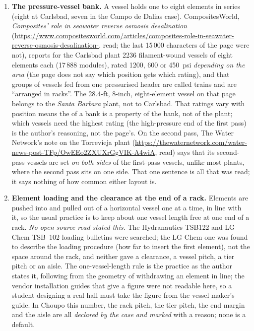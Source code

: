 \documentclass[11pt,a4paper]{article}
\begin{document}
\begin{enumerate}
\item \textbf{The pressure-vessel bank.}  A vessel holds one to eight
elements in series (eight at Carlsbad, seven in the Campo de Dalias case).
CompositesWorld, \emph{Composites' role in seawater reverse osmosis
desalination}
(\url{https://www.compositesworld.com/articles/composites-role-in-seawater-reverse-osmosis-desalination-},
read; the last 15\,000 characters of the page were not), reports for the
Carlsbad plant 2236 filament-wound vessels of eight elements each (17\,888
modules), rated 1200, 600 or 450~psi \emph{depending on the area} (the page
does not say which position gets which rating), and that groups of vessels
fed from one pressurised header are called trains and are ``arranged in
racks''.  The 28.4-ft, 8-inch, eight-element vessel on that page belongs to
the \emph{Santa Barbara} plant, not to Carlsbad.  That ratings vary with
position means the  of a bank is a property of the
bank, not of the plant; which vessels need the highest rating (the
high-pressure end of the first pass) is the author's reasoning, not the
page's.  On the second pass, The Water Network's note on the Torrevieja plant
(\url{https://thewaternetwork.com/water-news-post-TFp/OwEEo2ZXUXrGgVIK-A4wiA},
read) says that its second-pass vessels are set \emph{on both sides} of the
first-pass vessels, unlike most plants, where the second pass sits on one
side.  That one sentence is all that was read; it says nothing of how common
either layout is.

\item \textbf{Element loading and the clearance at the end of a rack.}
Elements are pushed into and pulled out of a horizontal vessel one at a time,
in line with it, so the usual practice is to keep about one vessel length free
at one end of a rack.  \emph{No open source read stated this.}  The
Hydranautics TSB122 and LG Chem TSB~102 loading bulletins were searched; the
LG Chem one was found to describe the loading procedure (how far to insert
the first element), not the space around the rack, and neither gave a
clearance, a vessel pitch, a tier pitch or an aisle.  The one-vessel-length
rule is the practice as the author states it, following from the geometry of
withdrawing an element in line; the vendor installation guides that give a
figure were not readable here, so a student designing a real hall must take
the figure from the vessel maker's guide.  In Choupo this number, the rack
pitch, the tier pitch, the end margin and the aisle are all \emph{declared by
the case and marked } with a reason; none is a
default.
\end{enumerate}
\endgroup
\end{document}
